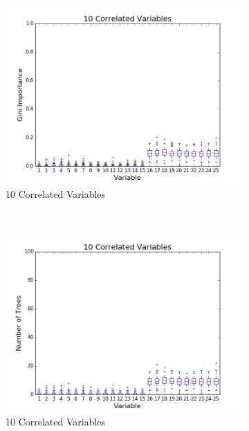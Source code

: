 \begin{figure}[h!]
\begin{subfigure}[b]{0.45\textwidth}
    \includegraphics[width=\textwidth]{figures/random_forests/rf_correlated_1_0_10.png}
    \caption{10 Correlated Variables}
    \label{fig:corr-1-10}
  \end{subfigure}
  ~
  \begin{subfigure}[b]{0.45\textwidth}
    \includegraphics[width=\textwidth]{figures/random_forests/rf_correlated_1_0_10_feature_counts.png}
    \caption{10 Correlated Variables}
    \label{fig:corr-1-10-counts}
  \end{subfigure}
  ~
  \begin{subfigure}[b]{0.45\textwidth}

\end{subfigure}
\end{figure}
